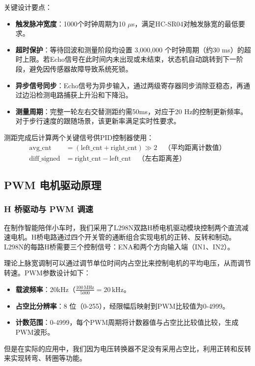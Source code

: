 \documentclass[12pt,a4paper]{ctexart}
\begin{document}
关键设计要点：
\begin{itemize}
    \item \textbf{触发脉冲宽度}：1000个时钟周期为10 $\mu$s，满足HC-SR04对触发脉宽的最低要求。
    \item \textbf{超时保护}：等待回波和测量阶段均设置 3,000,000 个时钟周期（约30 ms）的超时上限。若Echo信号在此时间内未出现或未结束，状态机自动跳转到下一阶段，避免因传感器故障导致系统死锁。
    \item \textbf{异步信号同步}：Echo信号为异步输入，通过两级寄存器同步消除亚稳态，再通过边沿检测电路捕获上升沿和下降沿。
    \item \textbf{测量周期}：完整一轮左右交替测距约需50ms，对应于20 Hz的控制更新频率。对于步行速度的跟随场景，该更新率满足实时性要求。
\end{itemize}

测距完成后计算两个关键信号供PID控制器使用：
\begin{align}
\text{avg\_cnt} &= (\text{left\_cnt} + \text{right\_cnt}) \gg 2 \quad \text{（平均距离计数值）} \label{eq:avg}\\
\text{diff\_signed} &= \text{right\_cnt} - \text{left\_cnt} \quad \text{（左右距离差）} \label{eq:diff}
\end{align}

\subsection{PWM 电机驱动原理}

\subsubsection{H 桥驱动与 PWM 调速}

在制作智能陪伴小车时，我们采用了L298N双路H桥电机驱动模块控制两个直流减速电机。H桥电路通过四个开关管的通断组合实现电机的正转、反转和制动。L298N的每路H桥需要三个控制信号：ENA和两个方向输入端（IN1、IN2）。

理论上脉宽调制可以通过调节单位时间内占空比来控制电机的平均电压，从而调节转速。PWM参数设计如下：
\begin{itemize}
    \item \textbf{载波频率}：20kHz（$\frac{100\,\text{MHz}}{5000} = 20\,\text{kHz}$。
    \item \textbf{占空比分辨率}：8 位（0-255），经限幅后映射到PWM比较值为0-4999。
    \item \textbf{计数范围}：0-4999，每个PWM周期将计数器值与占空比比较值比较，生成PWM波形。
\end{itemize}
但是在实际的应用中，我们因为电压转换器不足没有采用占空比，利用正转和反转来实现转弯、转圈等功能。
\end{document}
